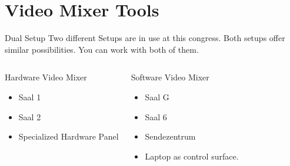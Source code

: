 \documentclass[aspectratio=169]{beamer}
\begin{document}
\section{Video Mixer Tools}

\begin{frame}{Dual Setup}
	Two different Setups are in use at this congress. 
	Both setups offer similar possibilities. 
	You can work with both of them.

	\begin{columns}[T,onlytextwidth]
		\begin{exampleblock}{Hardware Video Mixer}
			\begin{itemize}
				\item Saal 1
				\item Saal 2
				\item Specialized Hardware Panel
			\end{itemize}
		\end{exampleblock}

		\begin{exampleblock}{Software Video Mixer}
			\begin{itemize}
				\item Saal G
				\item Saal 6
				\item Sendezentrum
				\item Laptop as control surface.
			\end{itemize}
		\end{exampleblock}
	\end{columns}

\end{frame}
\end{document}
